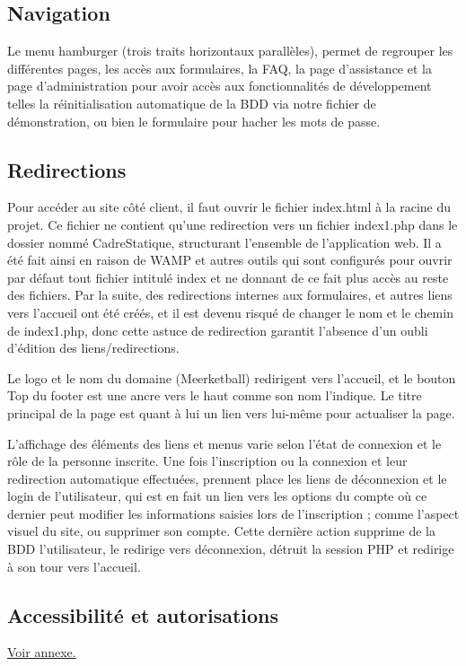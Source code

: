 \documentclass[12pt]{report}
\begin{document}
        \subsection{Navigation}
\par
Le menu hamburger (trois traits horizontaux parallèles), permet de regrouper les différentes pages, les accès aux formulaires, la FAQ, la page d’assistance et la page d’administration pour avoir accès aux fonctionnalités de développement telles la réinitialisation automatique de la BDD via notre fichier de démonstration, ou bien le formulaire pour hacher les mots de passe.
        \subsection{Redirections}
\par            
Pour accéder au site côté client, il faut ouvrir le fichier index.html à la racine du projet. Ce fichier ne contient qu’une redirection vers un fichier index1.php dans le dossier nommé CadreStatique, structurant l’ensemble de l’application web. Il a été fait ainsi en raison de WAMP et autres outils qui sont configurés pour ouvrir par défaut tout fichier intitulé index et ne donnant de ce fait plus accès au reste des fichiers. Par la suite, des redirections internes aux formulaires, et autres liens vers l’accueil ont été créés, et il est devenu risqué de changer le nom et le chemin de index1.php, donc cette astuce de redirection garantit l’absence d’un oubli d’édition des liens/redirections.
\bigskip
\par    
Le logo et le nom du domaine (Meerketball) redirigent vers l’accueil, et le bouton Top du footer est une ancre vers le haut comme son nom l’indique. Le titre principal de la page est quant à lui un lien vers lui-même pour actualiser la page.
\bigskip
\par    
L’affichage des éléments des liens et menus varie selon l’état de connexion et le rôle de la personne inscrite. Une fois l’inscription ou la connexion et leur redirection automatique effectuées, prennent place les liens de déconnexion et le login de l’utilisateur, qui est en fait un lien vers les options du compte où ce dernier peut modifier les informations saisies lors de l’inscription ; comme l’aspect visuel du site, ou supprimer son compte. Cette dernière action supprime de la BDD l’utilisateur, le redirige vers déconnexion, détruit la session PHP et redirige à son tour vers l’accueil.
        \subsection{Accessibilité et autorisations}
\par
\hyperlink{annexe-access-et-auto}{Voir annexe.} 
\hypertarget{retour-access-auto}{}
\end{document}
